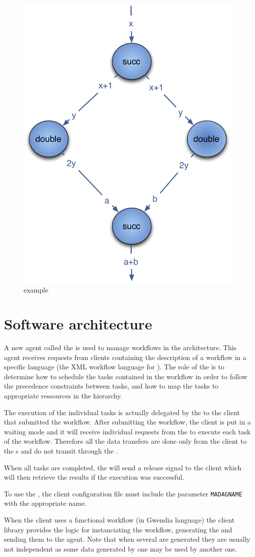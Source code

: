 \begin{figure}[htbp]
  \centering
  \includegraphics[keepaspectratio,width=0.4\linewidth]{fig/wf_example1}
  \caption{\DAG example}
  \label{fig:example1}
\end{figure}

\section{Software architecture}

A new agent called the \textit{\madag} is used to manage workflows in the \diet
architecture. This agent receives requests from clients containing the
description of a workflow in a specific language (the \madag XML workflow
language for \DAGS). The role of the \madag is to determine how to schedule the
tasks contained in the workflow in order to follow the precedence constraints
between tasks, and how to map the tasks to appropriate ressources in the \diet
hierarchy.

The execution of the individual tasks is actually delegated by the \madag to
the client that submitted the workflow. After submitting the workflow, the
client is put in a waiting mode and it will receive individual requests from
the \madag to execute each task of the workflow. Therefore all the data
transfers are done only from the client to the {\sed}s and do not transit
through the \madag.

When all tasks are completed, the \madag will send a release signal to the
client which will then retrieve the results if the execution was successful.

To use the \madag, the client configuration file must include the parameter
\texttt{MADAGNAME} with the appropriate name.

When the client uses a functional workflow (in Gwendia language) the \diet
client library provides the logic for instanciating the workflow, generating
the \DAGS and sending them to the \madag agent. Note that when several \DAGS are
generated they are usually not independent as some data generated by one \DAG
may be used by another one.

